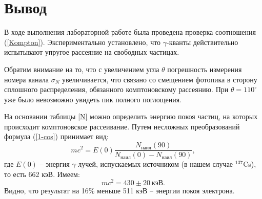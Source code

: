 \documentclass[a4paper,12pt]{article} %
\begin{document}
		\newpage
\newpage

\section{Вывод}
	В ходе выполнения лабораторной работе была проведена проверка соотношения (\ref{Kompton}). Экспериментально установлено, что $\gamma$-кванты действительно испытывают упругое рассеяние на свободных частицах. 
	
	Обратим внимание на то, что с увеличением угла $\theta$ погрешность измерения номера канала $\sigma_N$ увеличивается, что связано со смещением фотопика в сторону сплошного распределения, обязанного комптоновскому рассеянию. При $\theta = 110^\circ$ уже было невозможно увидеть пик полного поглощения.

	На основании таблицы \ref{N} можно определить энергию покоя частиц, на которых происходит комптоновское рассеивание. Путем несложных преобразований формула (\ref{1-cos}) принимает вид:
	\begin{equation*}
		mc^2 = E(0) \frac{N_\text{наил}(90)}{N_\text{наил}(0)-N_\text{наил}(90)},
	\end{equation*}
	где $E(0)$ -- энергия $\gamma$-лучей, испускаемых источником (в нашем случае $^{137}$Cs), то есть 662 кэВ. Имеем:
	\[
	\boxed{mc^2 = 430 \pm 20 \ \text{кэВ}}.
	\]
	Видно, что результат на 16\% меньше 511 кэВ -- энергии покоя электрона. 
	
	
	
	
	
\end{document}
